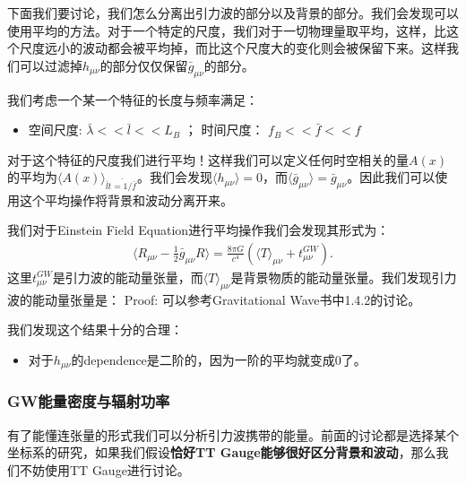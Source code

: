 \bigskip
{}

下面我们要讨论，我们怎么分离出引力波的部分以及背景的部分。我们会发现可以使用平均的方法。对于一个特定的尺度，我们对于一切物理量取平均，这样，比这个尺度远小的波动都会被平均掉，而比这个尺度大的变化则会被保留下来。这样我们可以过滤掉$
h_{\mu \nu} $的部分仅仅保留$ \bar{g}_{\mu \nu} $的部分。

我们考虑一个某一个特征的长度与频率满足：
\begin{itemize}
  \item 空间尺度: $ \bar{\lambda} << \bar{l} << L_B $ ； 时间尺度： $ f_B <<
    \bar{f} << f $
\end{itemize}
对于这个特征的尺度我们进行平均！这样我们可以定义任何时空相关的量$ A(x) $的平均为$ \langle
A(x)\rangle_{\bar{l}\bar{t = 1/\bar{f}}} $。我们会发现$ \langle h_{\mu \nu}
\rangle = 0 $，而$ \langle \bar{g}_{\mu \nu} \rangle = \bar{g}_{\mu
\nu} $。因此我们可以使用这个平均操作将背景和波动分离开来。

\bigskip
{}

我们对于Einstein Field Equation进行平均操作我们会发现其形式为：
\begin{align}
  \langle R_{\mu\nu}-\frac{1}{2}\bar{g}_{\mu\nu}R\rangle=\frac{8\pi
  G}{c^4}\left(\langle T\rangle_{\mu\nu}+t_{\mu\nu}^{GW}\right).
\end{align}
这里$ t_{\mu\nu}^{GW} $是引力波的能动量张量，而$  \langle T\rangle_{\mu\nu}
$是背景物质的能动量张量。我们发现引力波的能动量张量是：
Proof: 可以参考Gravitational Wave书中1.4.2的讨论。

我们发现这个结果十分的合理：
\begin{itemize}
  \item 对于$ h_{\mu \nu} $的dependence是二阶的，因为一阶的平均就变成0了。
\end{itemize}

\subsubsection{GW能量密度与辐射功率}

有了能懂连张量的形式我们可以分析引力波携带的能量。前面的讨论都是选择某个坐标系的研究，如果我们假设\textbf{恰好TT
Gauge能够很好区分背景和波动}，那么我们不妨使用TT Gauge进行讨论。

